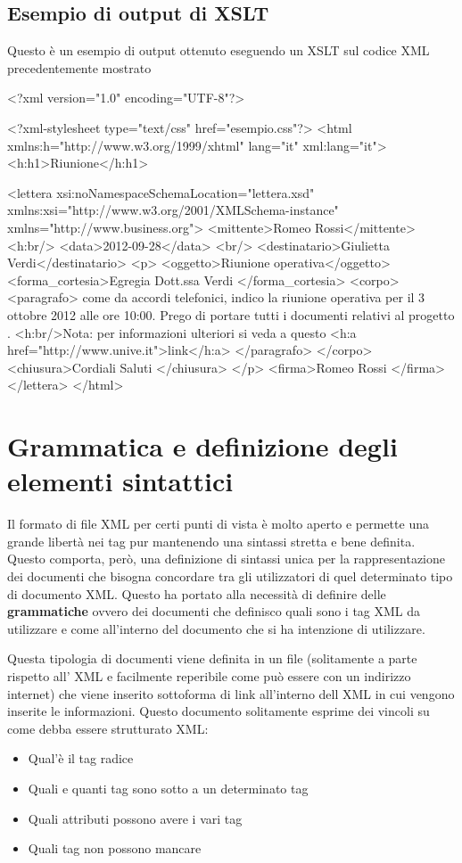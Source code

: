 \documentclass[a4paper,12pt]{report}
\begin{document}
\subsection{Esempio di output di XSLT}
Questo è un esempio di output ottenuto eseguendo un XSLT sul codice XML precedentemente mostrato
\begin{xml}
<?xml version="1.0" encoding="UTF-8"?>

<?xml-stylesheet type="text/css" href="esempio.css"?>
<html xmlns:h="http://www.w3.org/1999/xhtml" lang="it"
 xml:lang="it">
<h:h1>Riunione</h:h1>

<lettera xsi:noNamespaceSchemaLocation="lettera.xsd" 
xmlns:xsi="http://www.w3.org/2001/XMLSchema-instance" 
xmlns="http://www.business.org">
<mittente>Romeo Rossi</mittente><h:br/>
<data>2012-09-28</data>
<br/>
<destinatario>Giulietta Verdi</destinatario>
<p>
<oggetto>Riunione operativa</oggetto>
<forma_cortesia>Egregia Dott.ssa Verdi </forma_cortesia>
<corpo>
<paragrafo>
come da accordi telefonici, indico la riunione operativa 
per il 3 ottobre 2012 alle ore 10:00. 
Prego di portare tutti i documenti relativi al progetto
.
<h:br/>Nota: per informazioni ulteriori si veda a questo 
<h:a href="http://www.unive.it">link</h:a>
</paragrafo>
</corpo>
<chiusura>Cordiali Saluti
</chiusura>
</p>
<firma>Romeo Rossi
</firma>
</lettera>
</html>

\end{xml}



\section{Grammatica e definizione degli elementi sintattici}
Il formato di file XML per certi punti di vista è molto aperto e permette una grande libertà nei tag pur mantenendo una sintassi stretta e bene definita.
Questo comporta, però, una definizione di sintassi unica per la rappresentazione dei documenti che bisogna concordare tra gli utilizzatori di quel determinato tipo di documento XML. Questo ha portato alla necessità di definire delle \textbf{grammatiche} ovvero dei documenti che definisco quali sono i tag XML da utilizzare e come all'interno del documento che si ha intenzione di utilizzare.


Questa tipologia di documenti viene definita in un file (solitamente a parte rispetto all' XML e facilmente reperibile come può essere con un indirizzo internet) che viene inserito sottoforma di link all'interno dell XML in cui vengono inserite le informazioni. Questo documento solitamente esprime dei vincoli su come debba essere strutturato XML: 
\begin{itemize}
\item Qual'è il tag radice
\item Quali e quanti tag sono sotto a un determinato tag
\item Quali attributi possono avere i vari tag
\item Quali tag non possono mancare 
\end{itemize}
\end{document}
